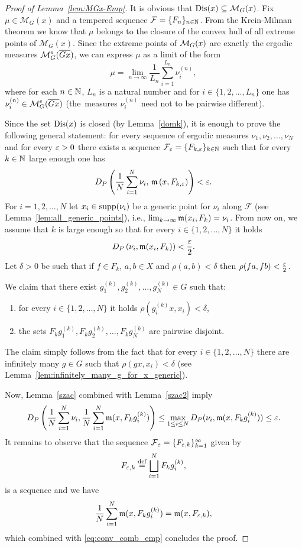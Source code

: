 \begin{proof}[Proof of Lemma~\ref{lem:MGx-Emp}]
It is obvious that $\operatorname{Dis}(x)\subseteq\mathcal{M}_G(x)$. 
Fix $\mu\in \mathcal{M}_G(x)$ and a tempered \Folner sequence $\mathcal F=\{F_n\}_{n\in\mathbb{N}}$.
From the Krein-Milman theorem we know that $\mu$ belongs to the closure of the convex hull of all extreme points of $\mathcal{M}_G(x)$. 
%
Since the extreme points of $\operatorname{\mathcal{M}}_G(x)$ are exactly the ergodic measures $\operatorname{\mathcal{M}}_G^e(\overline{Gx})$, we can express $\mu$ as a limit of the form
\[
\mu=\lim_{n\to\infty} \frac{1}{L_n} \sum_{i=1}^{L_n} \nu_i^{(n)},
\]
 where for each $n\in\mathbb{N}$, $L_n$ is a natural number and for $i\in\{1,2,\ldots,L_n\}$ one has $\nu_{i}^{(n)}\in\operatorname{\mathcal{M}}^e_G(\overline{Gx})$ (the~measures $\nu_{i}^{(n)}$ need not to be pairwise different).
 
Since the set $\operatorname{Dis}(x)$ is closed (by Lemma~\ref{domk}), it is enough to prove the following general statement: for every sequence of ergodic measures $\nu_1, \nu_2, \ldots, \nu_N$ and for every $\varepsilon>0$ there exists a \Folner sequence $\mathcal F_{\varepsilon}=\{F_{k,\varepsilon}\}_{k\in\mathbb{N}}$ such that for every $k\in\mathbb{N}$ large enough one has
\[
D_P\left(\frac{1}{N} \sum_{i=1}^{N} \nu_i,\, \operatorname{\mathfrak m}\left(x, F_{k,\varepsilon}\right)\right)<\varepsilon.
\]
For $i=1,2,\ldots,N$ let $x_i\in\operatorname{supp}(\nu_i)$ be a generic point for $\nu_i$ along $\mathcal F$ (see Lemma~\ref{lem:all_generic_points}), i.e., $\lim_{k\to \infty} \operatorname{\mathfrak m}(x_i, F_k) = \nu_i$.
%
From now on, we assume that $k$ is large enough so that
for every $i\in\{1,2, \ldots, N\}$ it holds
\[
D_P\left(\nu_i, \operatorname{\mathfrak m}(x_i, F_k)\right)<\frac{\varepsilon}{2}.
\]
Let $\delta>0$ be such that if $f\in F_k$, $a,b\in X$ and $\rho(a,b)<\delta$ then $\rho(fa, fb)<\frac{\varepsilon}{2}$.
%

We claim that there exist $g_1^{(k)}, g_2^{(k)}, \ldots, g_N^{(k)}\in G$ such that:
\begin{enumerate}
\item for every $i\in\{1,2, \ldots, N\}$ it holds $\rho(g_i^{(k)} x, x_i)<\delta$,
\item the sets $F_k g_1^{(k)}, F_k g_2^{(k)}, \ldots, F_kg_N^{(k)}$ are pairwise disjoint.
\end{enumerate}
The claim simply follows from the fact that for every $i\in\{1,2, \ldots, N\}$ there are infinitely many $g\in G$ such that $\rho(gx, x_i)<\delta$ (see Lemma~\ref{lem:infinitely_many_g_for_x_generic}). 


Now, Lemma~\ref{szac} combined with Lemma~\ref{szac2} imply
\begin{equation}\label{eq:conv_comb_emp}
D_P\left(\frac{1}{N}\sum_{i=1}^N \nu_i, \frac{1}{N} \sum_{i=1}^N \operatorname{\mathfrak m}(x, F_kg_i^{(k)})\right)\leq \max_{1\leq i\leq N} D_P(\nu_i, \operatorname{\mathfrak m}(x, F_kg_i^{(k)})) \leq \varepsilon.
\end{equation}
It remains to observe that the sequence $\operatorname{\mathcal{F}}_{\varepsilon} = \{F_{\varepsilon,k}\}_{k=1}^{\infty}$ given by
\[
F_{\varepsilon, k}\stackrel{\textup{def}}{=} \bigsqcup_{i=1}^N F_k g_i^{(k)},
\]
is a \Folner sequence and we have
\[
\frac{1}{N} \sum_{i=1}^N \operatorname{\mathfrak m}(x, F_kg_i^{(k)}) = \operatorname{\mathfrak m}(x, F_{\varepsilon, k}),
\]
which combined with \eqref{eq:conv_comb_emp} concludes the proof.
\end{proof}

